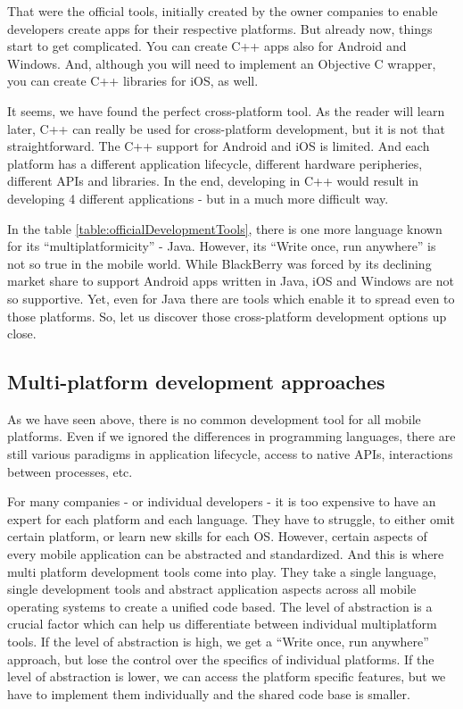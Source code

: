 \documentclass[english,master,public,dept460,male,cpdeclaration,oneside]{diploma}
\begin{document}
That were the official tools, initially created by the owner companies to enable developers create apps for their respective platforms. But already now, things start to get complicated. You can create C++ apps also for Android and Windows. And, although you will need to implement an Objective C wrapper, you can create C++ libraries for iOS, as well.

It seems, we have found the perfect cross-platform tool. As the reader will learn later, C++ can really be used for cross-platform development, but it is not that straightforward. The C++ support for Android and iOS is limited. And each platform has a different application lifecycle, different hardware peripheries, different APIs and libraries. In the end, developing in C++ would result in developing 4 different applications - but in a much more difficult way.

In the table \ref{table:officialDevelopmentTools}, there is one more language known for its “multiplatformicity” - Java. However, its “Write once, run anywhere” is not so true in the mobile world. While BlackBerry was forced by its declining market share to support Android apps written in Java, iOS and Windows are not so supportive. Yet, even for Java there are tools which enable it to spread even to those platforms. So, let us discover those cross-platform development options up close.

\subsection{Multi-platform development approaches}
As we have seen above, there is no common development tool for all mobile platforms. Even if we ignored the differences in programming languages, there are still various paradigms in application lifecycle, access to native APIs, interactions between processes, etc.

For many companies - or individual developers - it is too expensive to have an expert for each platform and each language. They have to struggle, to either omit certain platform, or learn new skills for each OS. However, certain aspects of every mobile application can be abstracted and standardized. And this is where multi platform development tools come into play. They take a single language, single development tools and abstract application aspects across all mobile operating systems to create a unified code based. The level of abstraction is a crucial factor which can help us differentiate between individual multiplatform tools. If the level of abstraction is high, we get a “Write once, run anywhere” approach, but lose the control over the specifics of individual platforms. If the level of abstraction is lower, we can access the platform specific features, but we have to implement them individually and the shared code base is smaller.
\end{document}
